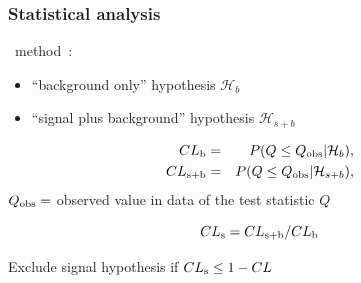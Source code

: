 \begin{frame}\frametitle{Statistical analysis}
\centering\myskip\scriptsize


\ method~\cite{cls,cls_2}:

\begin{itemize}
\item ``background only'' hypothesis $\mathcal{H}_{b}$
\item ``signal plus background'' hypothesis $\mathcal{H}_{s+b}$ 
\end{itemize}

\begin{eqnarray*}
\cls{b} &=& P(Q \leq Q_{\rm obs}|\mathcal{H}_{b}),\\
\cls{s+b} &=& P(Q \leq Q_{\rm obs}|\mathcal{H}_{s+b}),
\end{eqnarray*}
$Q_{\rm obs} = $ observed value in data of the 
test statistic $Q$

$$\cls{s} = \cls{s+b}/\cls{b}$$


{\cccolor Exclude} signal hypothesis if $\cls{s} \leq 1 - CL$ 




\end{frame}

